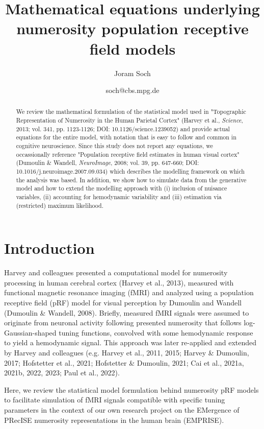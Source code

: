 \documentclass[a4paper,12pt]{article}
\title{Mathematical equations underlying \\ numerosity population receptive field models}
\author{Joram Soch}
\date{soch@cbs.mpg.de}
\begin{document}
	

\maketitle


\begin{abstract}
\noindent
We review the mathematical formulation of the statistical model used in "Topographic Representation of Numerosity in the Human Parietal Cortex" (Harvey et al., \textit{Science}, 2013; vol. 341, pp. 1123-1126; DOI: 10.1126/science.1239052) and provide actual equations for the entire model, with notation that is easy to follow and common in cognitive neuroscience. Since this study does not report any equations, we occassionally reference "Population receptive field estimates in human visual cortex" (Dumoulin \& Wandell, \textit{NeuroImage}, 2008; vol. 39, pp. 647-660; DOI: 10.1016/j.neuroimage.2007.09.034) which describes the modelling framework on which the analysis was based. In addition, we show how to simulate data from the generative model and how to extend the modelling approach with (i) inclusion of nuisance variables, (ii) accounting for hemodynamic variability and (iii) estimation via (restricted) maximum likelihood.
\end{abstract}


\pagebreak
\tableofcontents


\pagebreak
{}
\section{Introduction} \label{sec:Intro}

Harvey and colleagues presented a computational model for numerosity processing in human cerebral cortex (Harvey et al., 2013), measured with functional magnetic resonance imaging (fMRI) and analyzed using a population receptive field (pRF) model for visual perception by Dumoulin and Wandell (Dumoulin \& Wandell, 2008). Briefly, measured fMRI signals were assumed to originate from neuronal activity following presented numerosity that follows log-Gaussian-shaped tuning functions, convolved with some hemodynamic response to yield a hemodynamic signal. This approach was later re-applied and extended by Harvey and colleagues (e.g. Harvey et al., 2011, 2015; Harvey \& Dumoulin, 2017; Hofstetter et al., 2021; Hofstetter \& Dumoulin, 2021; Cai et al., 2021a, 2021b, 2022, 2023; Paul et al., 2022).

Here, we review the statistical model formulation behind numerosity pRF models to facilitate simulation of fMRI signals compatible with specific tuning parameters in the context of our own research project on the EMergence of PRecISE numerosity representations in the human brain (EMPRISE).
\end{document}
